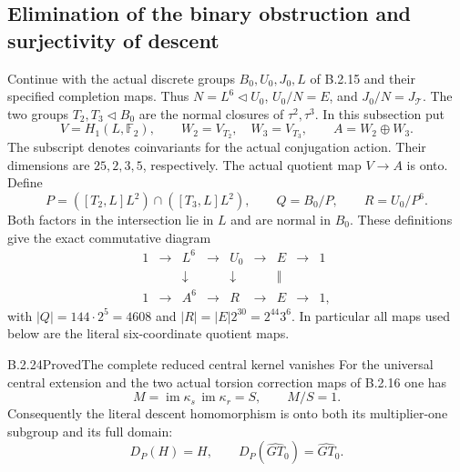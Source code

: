 \subsection{Elimination of the binary obstruction and surjectivity of descent}

Continue with the actual discrete groups $B_0,U_0,J_0,L$
of B.2.15 and their specified completion maps.  Thus
$N=L^6\triangleleft U_0$, $U_0/N=E$, and
$J_0/N=J_{\mathcal T}$.  The two groups
$T_2,T_3\triangleleft B_0$ are the normal closures of
$\tau^2,\tau^3$.  In this subsection put
\[
 V=H_1(L,\mathbb F_2),\qquad
 W_2=V_{T_2},\quad W_3=V_{T_3},\qquad
 A=W_2\oplus W_3.                                      \tag{B.S61}
\]
The subscript denotes coinvariants for the actual
conjugation action.  Their dimensions are $25,2,3,5$,
respectively.  The actual quotient map $V\to A$ is onto.
Define
\[
 P=([T_2,L]L^2)\cap([T_3,L]L^2),\qquad
 Q=B_0/P,\qquad R=U_0/P^6.                              \tag{B.S62}
\]
Both factors in the intersection lie in $L$ and are
normal in $B_0$.  These definitions give the exact
commutative diagram
\[
\begin{array}{ccccccccc}
 1&\longrightarrow&L^6&\longrightarrow&U_0&\longrightarrow&E&\longrightarrow&1\\
 &&\downarrow&&\downarrow&&\Vert\\
 1&\longrightarrow&A^6&\longrightarrow&R&\longrightarrow&E&\longrightarrow&1,
\end{array}                                                   \tag{B.S63}
\]
with $|Q|=144\cdot2^5=4608$ and
$|R|=|E|2^{30}=2^{44}3^6$.  In particular all maps
used below are the literal six-coordinate quotient maps.

\begin{result}{B.2.24}{Proved}{The complete reduced central kernel vanishes}
For the universal central extension and the two actual
torsion correction maps of B.2.16 one has
\[
 M=\operatorname{im}\kappa_s\,
                  \operatorname{im}\kappa_r=S,
                  \qquad M/S=1.                           \tag{B.S64}
\]
Consequently the literal descent homomorphism is onto
both its multiplier-one subgroup and its full domain:
\[
                D_P(H)=H,\qquad
 D_P(\widehat{GT}_0)=\widehat{GT}_0.                        \tag{B.S65}
\]
\end{result}

